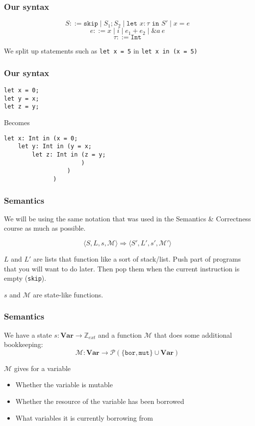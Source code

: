 \documentclass{beamer}
\newcommand{\sk}[0]{\texttt{skip}}
\newcommand{\letm}[2]{\texttt{let }#1 : \tau \texttt{ in } #2}
\newcommand{\sosb}[4]{\langle #1, #2, #3, \mathcal{#4} \rangle}
\begin{document}
\begin{frame}[fragile]
\frametitle{Our syntax}

$$S ::= \sk \mid S_1; S_2 \mid \letm{x}{S'} \mid x = e$$
$$e ::= x \mid i \mid e_1 + e_2 \mid \&a~e$$
$$\tau ::= \texttt{Int}$$

We split up statements such as \texttt{let x = 5} in \texttt{let x in (x = 5)}
\end{frame}


\begin{frame}[fragile]
\frametitle{Our syntax}
\begin{lstlisting}
let x = 0;
let y = x;
let z = y;
\end{lstlisting}
Becomes
\begin{lstlisting}
let x: Int in (x = 0;
    let y: Int in (y = x;
        let z: Int in (z = y;
                      )
                  )
              )
\end{lstlisting}
\end{frame}

\begin{frame}[fragile]
\frametitle{Semantics}
We will be using the same notation that was used in the Semantics \& Correctness course as much as possible.

$$\sosb{S}{L}{s}{M} \Rightarrow \sosb{S'}{L'}{s'}{M'}$$

$L$ and $L'$ are lists that function like a sort of stack/list. Push part of programs that you will want to do later. Then pop them when the current instruction is empty (\sk).

$s$ and $\mathcal{M}$ are state-like functions.
\end{frame}

\begin{frame}[fragile]
\frametitle{Semantics}
We have a state $s: \textbf{Var} \to \mathbb{Z}_{ext}$ and a function $\mathcal{M}$ that does some additional bookkeeping:
$$\mathcal{M}: \textbf{Var} \to \mathcal{P}(\{\texttt{bor}, \texttt{mut}\} \cup \textbf{Var})$$ 

$\mathcal{M}$ gives for a variable
\begin{itemize}
\item Whether the variable is mutable
\item Whether the resource of the variable has been borrowed
\item What variables it is currently borrowing from
\end{itemize}
\end{frame}
\end{document}
